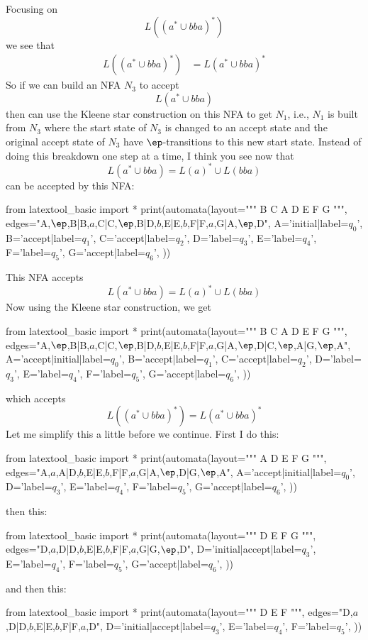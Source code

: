 Focusing on
\[
L((a^* \cup bba)^*)
\]
we see that
\begin{align*}
L((a^* \cup bba)^*)
&= L(a^* \cup bba)^*
\end{align*}
So if we can build an NFA $N_3$ to accept
\[
L(a^* \cup bba)
\]
then can use the Kleene star construction on this NFA to 
get $N_1$, i.e., $N_1$ is built from $N_3$ where the
start state of $N_3$ is changed to an accept state
and the original accept state of $N_3$ have $\ep$-transitions
to this new start state.
Instead of doing this breakdown one step at a time, I think you see
now that 
\[
L(a^* \cup bba)
= L(a)^* \cup L(bba)
\]
can be accepted by this NFA:
\begin{python}
from latextool_basic import *
print(automata(layout="""
   B  C
A
   D  E  F  G
""",
edges="A,$\ep$,B|B,$a$,C|C,$\ep$,B|D,$b$,E|E,$b$,F|F,$a$,G|A,$\ep$,D",
A='initial|label=$q_0$',
B='accept|label=$q_1$',
C='accept|label=$q_2$',
D='label=$q_3$',
E='label=$q_4$',
F='label=$q_5$',
G='accept|label=$q_6$',
))
\end{python}
This NFA accepts 
\[
L(a^* \cup bba)
= L(a)^* \cup L(bba)
\]
Now using the Kleene star construction, we get
\begin{python}
from latextool_basic import *
print(automata(layout="""
   B  C
A
   D  E  F  G
""",
edges="A,$\ep$,B|B,$a$,C|C,$\ep$,B|D,$b$,E|E,$b$,F|F,$a$,G|A,$\ep$,D|C,$\ep$,A|G,$\ep$,A",
A='accept|initial|label=$q_0$',
B='accept|label=$q_1$',
C='accept|label=$q_2$',
D='label=$q_3$',
E='label=$q_4$',
F='label=$q_5$',
G='accept|label=$q_6$',
))
\end{python}
which accepts
\[
L((a^* \cup bba)^*) = L(a^* \cup bba)^*
\]
Let me simplify this a little before we continue.
First I do this:
\begin{python}
from latextool_basic import *
print(automata(layout="""
A
   D  E  F  G
""",
edges="A,$a$,A|D,$b$,E|E,$b$,F|F,$a$,G|A,$\ep$,D|G,$\ep$,A",
A='accept|initial|label=$q_0$',
D='label=$q_3$',
E='label=$q_4$',
F='label=$q_5$',
G='accept|label=$q_6$',
))
\end{python}
then this:
\begin{python}
from latextool_basic import *
print(automata(layout="""
   D  E  F  G
""",
edges="D,$a$,D|D,$b$,E|E,$b$,F|F,$a$,G|G,$\ep$,D",
D='initial|accept|label=$q_3$',
E='label=$q_4$',
F='label=$q_5$',
G='accept|label=$q_6$',
))
\end{python}
and then this:
\begin{python}
from latextool_basic import *
print(automata(layout="""
   D  E  F
""",
edges="D,$a$,D|D,$b$,E|E,$b$,F|F,$a$,D",
D='initial|accept|label=$q_3$',
E='label=$q_4$',
F='label=$q_5$',
))
\end{python}

